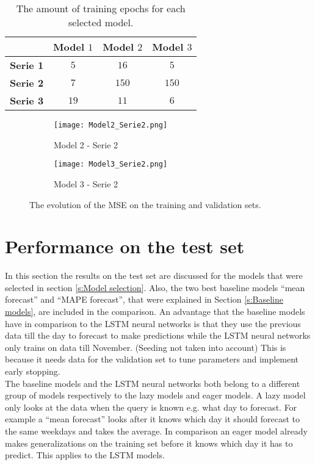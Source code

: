\begin{table}[h]
	\centering
	\begin{tabular}{@{}l|ccc@{}} \toprule
				         & \textbf{Model $ 1 $} & \textbf{Model $ 2 $} & \textbf{Model $ 3 $}\\\midrule
		\textbf{Serie 1} & $5 $&$ 16$  & $5 $\\
		\textbf{Serie 2} & $7 $&$ 150 $  & $150$\\
		\textbf{Serie 3} & $19 $&$ 11 $  & $6$\\\bottomrule
	\end{tabular}
	\caption{The amount of training epochs for each selected model.}
	\label{tab:summ_model_selection}
\end{table}

\begin{figure}	 	
	\centering
	\begin{subfigure}{0.49\textwidth}
	\texttt{[image: Model2\_Serie2.png]}
	\caption{Model 2 - Serie 2}
	\end{subfigure}	
	\begin{subfigure}{0.49\textwidth}
	\texttt{[image: Model3\_Serie2.png]}
	\caption{Model 3 - Serie 2}
	\end{subfigure}
	\caption{The evolution of the MSE on the training and validation sets.}
	\label{fig:training_validation}
\end{figure}



\section{Performance on the test set}
In this section the results on the test set are discussed for the models that were selected in section \ref{s:Model selection}. 
Also, the two best baseline models ``mean forecast'' and ``MAPE forecast'', that were explained in Section \ref{s:Baseline models}, are included in the comparison. An advantage that the baseline models have in comparison to the LSTM neural networks is that they use the previous data till the day to forecast to make predictions while the LSTM neural networks only trains on data till November. (Seeding not taken into account) This is because it needs data for the validation set to tune parameters and implement early stopping. \\

The baseline models and the LSTM neural networks both belong to a different group of models respectively to the lazy models and eager models. A lazy model only looks at the data when the query is known e.g. what day to forecast. For example a ``mean forecast'' looks after it knows which day it should forecast to the same weekdays and takes the average. In comparison an eager model already makes generalizations on the training set before it knows which day it has to predict. This applies to the LSTM models.\\

